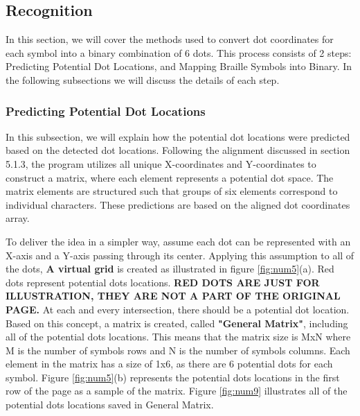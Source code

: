 \subsection{Recognition}
In this section, we will cover the methods used to convert dot coordinates for each symbol into a binary combination of 6 dots. This process consists of 2 steps: Predicting Potential Dot Locations, and Mapping Braille Symbols into Binary. In the following subsections we will discuss the details of each step.

\subsubsection{Predicting Potential Dot Locations}
In this subsection, we will explain how the potential dot locations were predicted based on the detected dot locations. Following the alignment discussed in section 5.1.3, the program utilizes all unique X-coordinates and Y-coordinates to construct a matrix, where each element represents a potential dot space. The matrix elements are structured such that groups of six elements correspond to individual characters. These predictions are based on the aligned dot coordinates array.

To deliver the idea in a simpler way, assume each dot can be represented with an X-axis and a Y-axis passing through its center. Applying this assumption to all of the dots, \textbf{A virtual grid} is created as illustrated in figure \ref{fig:num5}(a). Red dots represent potential dots locations. \textbf{RED DOTS ARE JUST FOR ILLUSTRATION, THEY ARE NOT A PART OF THE ORIGINAL PAGE.} At each and every intersection, there should be a potential dot location. Based on this concept, a matrix is created, called \textbf{"General Matrix"}, including all of the potential dots locations. This means that the matrix size is MxN where M is the number of symbols rows and N is the number of symbols columns. Each element in the matrix has a size of 1x6, as there are 6 potential dots for each symbol. Figure \ref{fig:num5}(b) represents the potential dots locations in the first row of the page as a sample of the matrix. Figure \ref{fig:num9} illustrates all of the potential dots locations saved in General Matrix.

